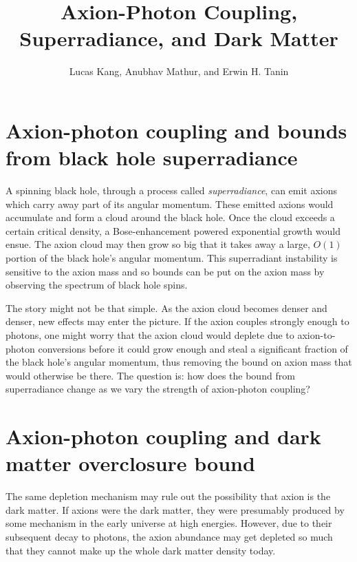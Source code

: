\documentclass[%
 reprint,
 amsmath,amssymb,
 aps,nofootinbib
]{revtex4-1}
\begin{document}
\title{Axion-Photon Coupling, Superradiance, and Dark Matter}
\author{Lucas Kang, Anubhav Mathur, and Erwin H. Tanin}


\maketitle


\tableofcontents


\section{Axion-photon coupling and bounds from black hole superradiance}


A spinning black hole, through a process called \textit{superradiance}, can emit axions which carry away part of its angular momentum. These emitted axions would accumulate and form a cloud around the black hole. Once the cloud exceeds a certain critical density, a Bose-enhancement powered exponential growth would ensue. The axion cloud may then grow so big that it takes away a large, $O(1)$ portion of the black hole's angular momentum. This superradiant instability is sensitive to the axion mass and so bounds can be put on the axion mass by observing the spectrum of black hole spins.

The story might not be that simple. As the axion cloud becomes denser and denser, new effects may enter the picture. If the axion couples strongly enough to photons, one might worry that the axion cloud would deplete due to axion-to-photon conversions before it could grow enough and steal a significant fraction of the black hole's angular momentum, thus removing the bound on axion mass that would otherwise be there. The question is: how does the bound from superradiance change as we vary the strength of axion-photon coupling?








\section{Axion-photon coupling and dark matter overclosure bound}
The same depletion mechanism may rule out the possibility that axion is the dark matter. If axions were the dark matter, they were presumably produced by some mechanism in the early universe at high energies. However, due to their subsequent decay to photons, the axion abundance may get depleted so much that they cannot make up the whole dark matter density today.
\end{document}
